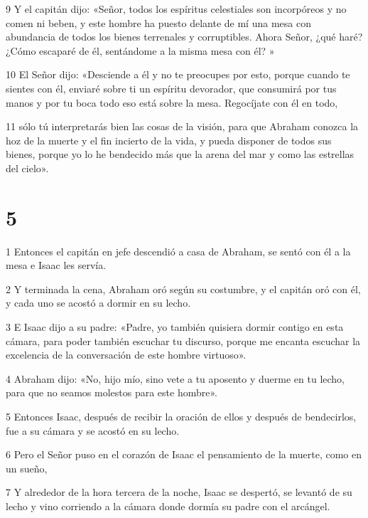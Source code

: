\par 9 Y el capitán dijo: «Señor, todos los espíritus celestiales son incorpóreos y no comen ni beben, y este hombre ha puesto delante de mí una mesa con abundancia de todos los bienes terrenales y corruptibles. Ahora Señor, ¿qué haré? ¿Cómo escaparé de él, sentándome a la misma mesa con él? »

\par 10 El Señor dijo: «Desciende a él y no te preocupes por esto, porque cuando te sientes con él, enviaré sobre ti un espíritu devorador, que consumirá por tus manos y por tu boca todo eso está sobre la mesa. Regocíjate con él en todo,

\par 11 sólo tú interpretarás bien las cosas de la visión, para que Abraham conozca la hoz de la muerte y el fin incierto de la vida, y pueda disponer de todos sus bienes, porque yo lo he bendecido más que la arena del mar y como las estrellas del cielo».

\chapter{5}

\par 1 Entonces el capitán en jefe descendió a casa de Abraham, se sentó con él a la mesa e Isaac les servía.

\par 2 Y terminada la cena, Abraham oró según su costumbre, y el capitán oró con él, y cada uno se acostó a dormir en su lecho.

\par 3 E Isaac dijo a su padre: «Padre, yo también quisiera dormir contigo en esta cámara, para poder también escuchar tu discurso, porque me encanta escuchar la excelencia de la conversación de este hombre virtuoso».

\par 4 Abraham dijo: «No, hijo mío, sino vete a tu aposento y duerme en tu lecho, para que no seamos molestos para este hombre».

\par 5 Entonces Isaac, después de recibir la oración de ellos y después de bendecirlos, fue a su cámara y se acostó en su lecho.

\par 6 Pero el Señor puso en el corazón de Isaac el pensamiento de la muerte, como en un sueño,

\par 7 Y alrededor de la hora tercera de la noche, Isaac se despertó, se levantó de su lecho y vino corriendo a la cámara donde dormía su padre con el arcángel.

